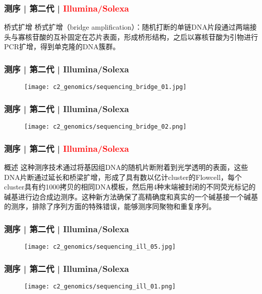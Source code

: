 \begin{frame}
  \frametitle{测序 | 第二代 | \textcolor{red}{Illumina/Solexa}}
  \begin{block}{桥式扩增}
桥式扩增（bridge amplification）：随机打断的单链DNA片段通过两端接头与寡核苷酸的互补固定在芯片表面，形成桥形结构，之后以寡核苷酸为引物进行PCR扩增，得到单克隆的DNA簇群。
  \end{block}
\end{frame}

\begin{frame}
  \frametitle{测序 | 第二代 | Illumina/Solexa}
  \begin{figure}
    \centering
    \texttt{[image: c2\_genomics/sequencing\_bridge\_01.jpg]}
  \end{figure}
\end{frame}

\begin{frame}
  \frametitle{测序 | 第二代 | Illumina/Solexa}
  \begin{figure}
    \centering
    \texttt{[image: c2\_genomics/sequencing\_bridge\_02.png]}
  \end{figure}
\end{frame}

\begin{frame}
  \frametitle{测序 | 第二代 | \textcolor{red}{Illumina/Solexa}}
  \begin{block}{概述}
这种测序技术通过将基因组DNA的随机片断附着到光学透明的表面，这些DNA片断通过延长和桥梁扩增，形成了具有数以亿计cluster的Flowcell，每个cluster具有约1000拷贝的相同DNA模板，然后用4种末端被封闭的不同荧光标记的碱基进行边合成边测序。这种新方法确保了高精确度和真实的一个碱基接一个碱基的测序，排除了序列方面的特殊错误，能够测序同聚物和重复序列。
  \end{block}
\end{frame}

\begin{frame}
  \frametitle{测序 | 第二代 | Illumina/Solexa}
  \begin{figure}
    \centering
    \texttt{[image: c2\_genomics/sequencing\_ill\_05.jpg]}
  \end{figure}
\end{frame}

\begin{frame}
  \frametitle{测序 | 第二代 | Illumina/Solexa}
  \begin{figure}
    \centering
    \texttt{[image: c2\_genomics/sequencing\_ill\_01.png]}
  \end{figure}
\end{frame}

